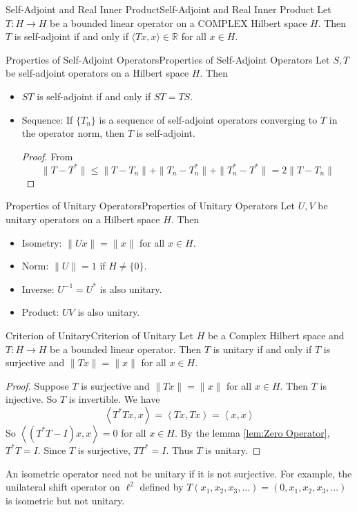 \documentclass[../main.tex]{subfiles}
\begin{document}
\begin{theorem}{Self-Adjoint and Real Inner Product}{Self-Adjoint and Real Inner Product}
	Let $T: H \to H$ be a bounded linear operator on a COMPLEX Hilbert space $H$. Then $T$ is self-adjoint if and only if $\langle Tx, x \rangle \in \mathbb{R}$ for all $x\in H$.
\end{theorem}

\begin{proposition}{Properties of Self-Adjoint Operators}{Properties of Self-Adjoint Operators}
	Let $S,T$ be self-adjoint operators on a Hilbert space $H$. Then
	\begin{itemize}
		\item $ST$ is self-adjoint if and only if $ST = TS$.
		\item Sequence: If $\{T_n\}$ is a sequence of self-adjoint operators converging to $T$ in the operator norm, then $T$ is self-adjoint.
			\begin{proof}
			From
			\begin{equation*}
				\|T-T^*\| \leq \|T-T_n\| + \|T_n - T_n^*\| + \|T_n^* - T^*\| = 2\|T-T_n\|
			\end{equation*}
			\end{proof}
	\end{itemize}
\end{proposition}

\begin{proposition}{Properties of Unitary Operators}{Properties of Unitary Operators}
	Let $U,V$ be unitary operators on a Hilbert space $H$. Then
	\begin{itemize}
		\item Isometry: $\|Ux\| = \|x\|$ for all $x\in H$.
		\item Norm: $\|U\| = 1$ if $H \neq \{0\}$.
		\item Inverse: $U^{-1} = U^*$ is also unitary.
		\item Product: $UV$ is also unitary.
	\end{itemize}
\end{proposition}

\begin{theorem}{Criterion of Unitary}{Criterion of Unitary}
	Let $H$ be a Complex Hilbert space and $T: H \to H$ be a bounded linear operator. Then $T$ is unitary if and only if $T$ is surjective and $\|Tx\| = \|x\|$ for all $x\in H$.
\end{theorem}
\begin{proof}
	Suppose $T$ is surjective and $\|Tx\| = \|x\|$ for all $x\in H$. Then $T$ is injective. So $T$ is invertible. We have
	\begin{equation*}
		\left<T^*Tx,x\right> = \left<Tx,Tx\right> = \left<x,x\right>
	\end{equation*}
	So $\left<(T^*T-I)x,x\right> = 0$ for all $x\in H$. By the lemma \ref{lem:Zero Operator}, $T^*T = I$. Since $T$ is surjective, $TT^* = I$. Thus $T$ is unitary.
\end{proof}

\begin{remark}
	An isometric operator need not be unitary if it is not surjective. For example, the unilateral shift operator on $\ell^2$ defined by $T(x_1,x_2,x_3,\ldots) = (0,x_1,x_2,x_3,\ldots)$ is isometric but not unitary.
\end{remark}
\end{document}
